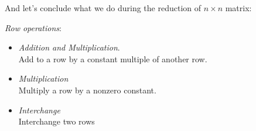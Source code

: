 And let's conclude what we do during the reduction of $n\times n$ matrix:
\begin{remark}
\textit{Row operations}:
\begin{itemize}
\item \emph{Addition and Multiplication}.\\
Add to a row by a constant multiple of another row.

\item \emph{Multiplication}\\
Multiply a row by a nonzero constant.
\item \emph{Interchange}\\
Interchange two rows
\end{itemize}
\end{remark}







